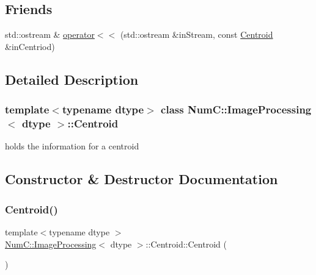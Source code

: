 \subsection*{Friends}
\begin{DoxyCompactItemize}
\item 
std\+::ostream \& \mbox{\hyperlink{class_num_c_1_1_image_processing_1_1_centroid_a5313d8a6a2d6a5fde55a8457650c54d3}{operator$<$$<$}} (std\+::ostream \&in\+Stream, const \mbox{\hyperlink{class_num_c_1_1_image_processing_1_1_centroid}{Centroid}} \&in\+Centriod)
\end{DoxyCompactItemize}


\subsection{Detailed Description}
\subsubsection*{template$<$typename dtype$>$\newline
class Num\+C\+::\+Image\+Processing$<$ dtype $>$\+::\+Centroid}

holds the information for a centroid 

\subsection{Constructor \& Destructor Documentation}
\mbox{\label{class_num_c_1_1_image_processing_1_1_centroid_ae789a362fe9ad26e1e40186cad8fc8df}} 
\subsubsection{\texorpdfstring{Centroid()}{Centroid()}\hspace{0.1cm}{\footnotesize\ttfamily [1/2]}}
{\footnotesize\ttfamily template$<$typename dtype $>$ \\
\mbox{\hyperlink{class_num_c_1_1_image_processing}{Num\+C\+::\+Image\+Processing}}$<$ dtype $>$\+::Centroid\+::\+Centroid (\begin{DoxyParamCaption}{ }\end{DoxyParamCaption})\hspace{0.3cm}{\ttfamily [inline]}}

